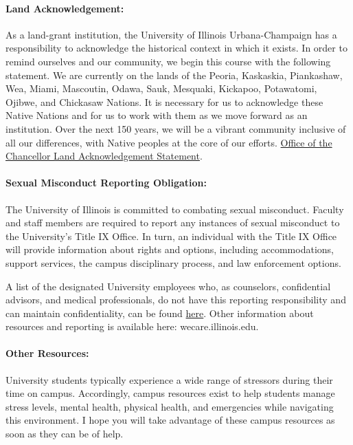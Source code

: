 \documentclass[11pt, a4paper]{article}
\begin{document}
\paragraph{Land Acknowledgement: }As a land-grant institution, the University of Illinois Urbana-Champaign has a responsibility to acknowledge the historical context in which it exists. In order to remind ourselves and our community, we begin this course with the following statement. We are currently on the lands of the Peoria, Kaskaskia, Piankashaw, Wea, Miami, Mascoutin, Odawa, Sauk, Mesquaki, Kickapoo, Potawatomi, Ojibwe, and Chickasaw Nations. It is necessary for us to acknowledge these Native Nations and for us to work with them as we move forward as an institution. Over the next 150 years, we will be a vibrant community inclusive of all our differences, with Native peoples at the core of our efforts. \href{https://chancellor.illinois.edu/land_acknowledgement.html}{Office of the Chancellor Land Acknowledgement Statement}.

\paragraph{Sexual Misconduct Reporting Obligation:} The University of Illinois is committed to combating sexual misconduct. Faculty and staff members are required to report any instances of sexual misconduct to the University’s Title IX Office. In turn, an individual with the Title IX Office will provide information about rights and options, including accommodations, support services, the campus disciplinary process, and law enforcement options.

A list of the designated University employees who, as counselors, confidential
advisors, and medical professionals, do not have this reporting responsibility
and can maintain confidentiality, can be found
\href{https://wecare.illinois.edu/resources/students/#confidential}{here}.
Other information about resources and reporting is available here: wecare.illinois.edu.

\paragraph{Other Resources:}
University students typically experience a wide range of stressors during their
time on campus. Accordingly, campus resources exist to help students manage
stress levels, mental health, physical health, and emergencies while navigating
this environment. I hope you will take advantage of these campus resources as
soon as they can be of help.
\end{document}
